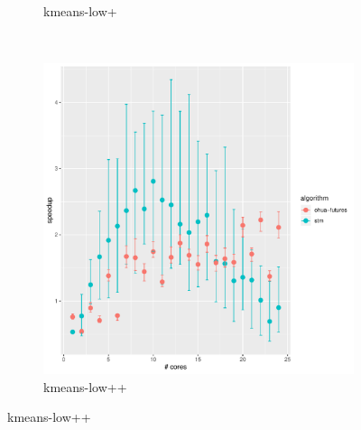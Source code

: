 \begin{figure}
\begin{subfigure}[t]{.32\textwidth}
        \caption{kmeans-low+}%
    \end{subfigure}%
    ~
    \begin{subfigure}[t]{.32\textwidth}
        \includegraphics[width=\textwidth,keepaspectratio]{gfx/results/kmeans/kmeans-low++}
        \caption{kmeans-low++}%
    \end{subfigure}%


\end{figure}
